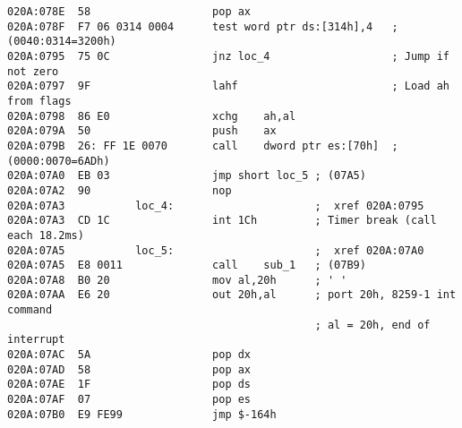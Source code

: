 \begin{lstlisting}[label=Листинг Int8h,caption=Листинг Int8h]
020A:078E  58                   pop ax
020A:078F  F7 06 0314 0004      test word ptr ds:[314h],4   ; (0040:0314=3200h)
020A:0795  75 0C                jnz loc_4                   ; Jump if not zero
020A:0797  9F                   lahf                        ; Load ah from flags
020A:0798  86 E0                xchg    ah,al
020A:079A  50                   push    ax
020A:079B  26: FF 1E 0070       call    dword ptr es:[70h]  ; (0000:0070=6ADh)
020A:07A0  EB 03                jmp short loc_5 ; (07A5)
020A:07A2  90                   nop
020A:07A3           loc_4:                      ;  xref 020A:0795
020A:07A3  CD 1C                int 1Ch         ; Timer break (call each 18.2ms)
020A:07A5           loc_5:                      ;  xref 020A:07A0
020A:07A5  E8 0011              call    sub_1   ; (07B9)
020A:07A8  B0 20                mov al,20h      ; ' '
020A:07AA  E6 20                out 20h,al      ; port 20h, 8259-1 int command
                                                ; al = 20h, end of interrupt
020A:07AC  5A                   pop dx
020A:07AD  58                   pop ax
020A:07AE  1F                   pop ds
020A:07AF  07                   pop es
020A:07B0  E9 FE99              jmp $-164h
\end{lstlisting}

